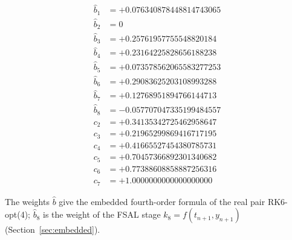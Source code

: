 {\begin{align*}
\hat b_{1} &= +0.076340878448814743065\\
\hat b_{2} &= 0\\
\hat b_{3} &= +0.25761957755548820184\\
\hat b_{4} &= +0.23164225828656188238\\
\hat b_{5} &= +0.073578562065583277253\\
\hat b_{6} &= +0.29083625203108993288\\
\hat b_{7} &= +0.12768951894766144713\\
\hat b_{8} &= -0.057707047335199484557\\[1mm]
c_{2} &= +0.34135342725462958647\\
c_{3} &= +0.21965299869416717195\\
c_{4} &= +0.41665527454380785731\\
c_{5} &= +0.70457366892301340682\\
c_{6} &= +0.77388608858887256316\\
c_{7} &= +1.0000000000000000000
\end{align*}
}

The weights $\hat b$ give the embedded fourth-order formula of the real pair RK6-opt(4); $\hat b_8$ is the weight of the FSAL stage $k_8=f(t_{n+1},y_{n+1})$ (Section~\ref{sec:embedded}).
